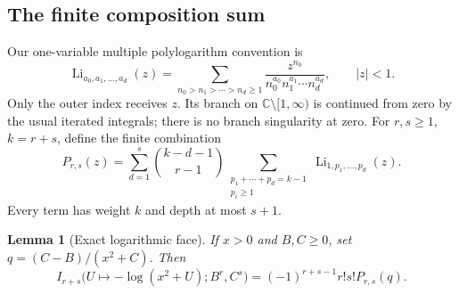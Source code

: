 \documentclass[11pt,a4paper]{article}
\numberwithin{equation}{section}
\newtheorem{lemma}[theorem]{Lemma}
\theoremstyle{definition}
\theoremstyle{remark}
\begin{document}
\subsection{The finite composition sum}

Our one-variable multiple polylogarithm convention is
\begin{equation}\label{tc:eq:MPL}
 \operatorname{Li}_{a_0,a_1,\ldots,a_d}(z)
  =\sum_{n_0>n_1>\cdots>n_d\ge1}
      \frac{z^{n_0}}{n_0^{a_0}n_1^{a_1}\cdots n_d^{a_d}},
 \qquad |z|<1.
\end{equation}
Only the outer index receives $z$.  Its branch on
$\mathbb C\setminus[1,\infty)$ is continued from zero by the
usual iterated integrals; there is no branch singularity at zero.
For $r,s\ge1$, $k=r+s$, define the finite combination
\begin{equation}\label{tc:eq:P}
 \boxed{\displaystyle
 P_{r,s}(z)=\sum_{d=1}^{s}\binom{k-d-1}{r-1}
      \sum_{\substack{p_1+\cdots+p_d=k-1\\p_i\ge1}}
                \operatorname{Li}_{1,p_1,\ldots,p_d}(z).}
\end{equation}
Every term has weight $k$ and depth at most $s+1$.

\begin{lemma}[Exact logarithmic face]
\label{tc:lem:logarithm}
If $x>0$ and $B,C\ge0$, set
$q=(C-B)/(x^2+C)$.  Then
\begin{equation}\label{tc:eq:logarithmic-face}
 I_{r+s}\bigl(U\mapsto-\log(x^2+U);B^r,C^s\bigr)
     =(-1)^{r+s-1}r!s!P_{r,s}(q).
\end{equation}
\end{lemma}
\end{document}
